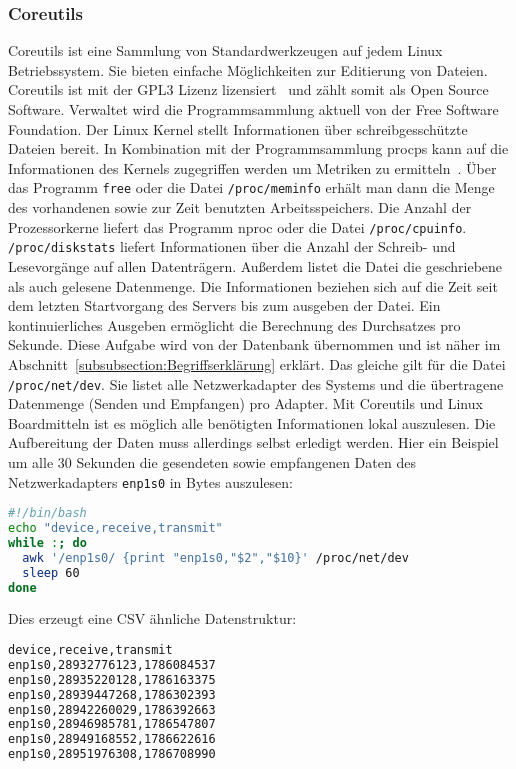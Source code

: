 \subsubsection{Coreutils}
Coreutils ist eine Sammlung von Standardwerkzeugen auf jedem Linux
Betriebssystem. Sie bieten einfache Möglichkeiten zur Editierung von Dateien.
Coreutils ist mit der GPL3 Lizenz lizensiert~\cite{coreutils} und zählt somit
als Open Source Software. Verwaltet wird die Programmsammlung aktuell von der
Free Software Foundation. Der Linux Kernel stellt Informationen über
schreibgesschützte Dateien bereit. In Kombination mit der Programmsammlung
procps kann auf die Informationen des Kernels zugegriffen werden um Metriken zu
ermitteln~\cite{procps}. Über das Programm \texttt{free} oder die Datei
\texttt{/proc/meminfo} erhält man dann die Menge des vorhandenen sowie zur Zeit
benutzten Arbeitsspeichers. Die Anzahl der Prozessorkerne liefert das Programm
nproc oder die Datei \texttt{/proc/cpuinfo}. \texttt{/proc/diskstats} liefert
Informationen über die Anzahl der Schreib- und Lesevorgänge auf allen
Datenträgern. Außerdem listet die Datei die geschriebene als auch gelesene
Datenmenge. Die Informationen beziehen sich auf die Zeit seit dem letzten
Startvorgang des Servers bis zum ausgeben der Datei. Ein kontinuierliches
Ausgeben ermöglicht die Berechnung des Durchsatzes pro Sekunde. Diese Aufgabe
wird von der Datenbank übernommen und ist näher im
Abschnitt~\ref{subsubsection:Begriffserklärung} erklärt. Das gleiche gilt für
die Datei \texttt{/proc/net/dev}. Sie listet alle Netzwerkadapter des Systems
und die übertragene Datenmenge (Senden und Empfangen) pro Adapter. Mit
Coreutils und Linux Boardmitteln ist es möglich alle benötigten Informationen
lokal auszulesen. Die Aufbereitung der Daten muss allerdings selbst erledigt
werden. Hier ein Beispiel um alle 30 Sekunden die gesendeten sowie empfangenen
Daten des Netzwerkadapters \texttt{enp1s0} in Bytes auszulesen:

\begin{lstlisting}[language=bash,caption={/proc mit awk parsen},label=lst:aw]
#!/bin/bash
echo "device,receive,transmit"
while :; do
  awk '/enp1s0/ {print "enp1s0,"$2","$10}' /proc/net/dev
  sleep 60
done
\end{lstlisting}

Dies erzeugt eine \gls{CSV} ähnliche Datenstruktur:

\begin{lstlisting}[language=bash,caption={traffic stats enp1s0}]
device,receive,transmit
enp1s0,28932776123,1786084537
enp1s0,28935220128,1786163375
enp1s0,28939447268,1786302393
enp1s0,28942260029,1786392663
enp1s0,28946985781,1786547807
enp1s0,28949168552,1786622616
enp1s0,28951976308,1786708990
\end{lstlisting}

